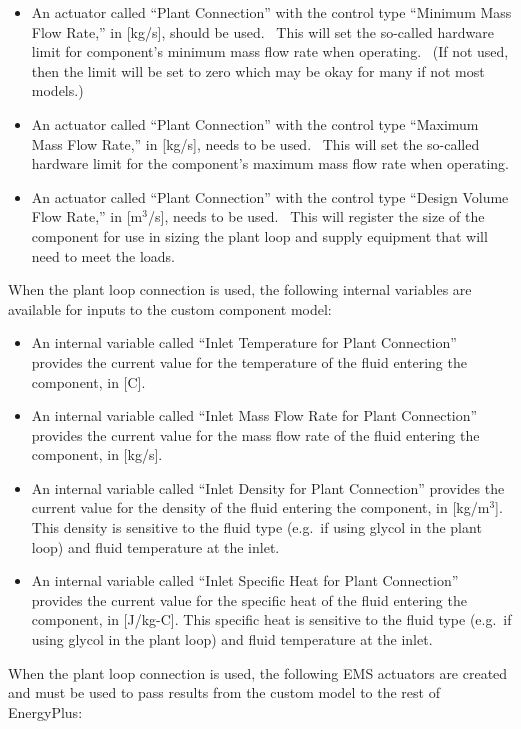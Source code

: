\begin{itemize}
\item
  An actuator called ``Plant Connection'' with the control type ``Minimum Mass Flow Rate,'' in {[}kg/s{]}, should be used.~ This will set the so-called hardware limit for component's minimum mass flow rate when operating.~ (If not used, then the limit will be set to zero which may be okay for many if not most models.)
\item
  An actuator called ``Plant Connection'' with the control type ``Maximum Mass Flow Rate,'' in {[}kg/s{]}, needs to be used.~ This will set the so-called hardware limit for the component's maximum mass flow rate when operating.
\item
  An actuator called ``Plant Connection'' with the control type ``Design Volume Flow Rate,'' in {[}m\(^{3}\)/s{]}, needs to be used.~ This will register the size of the component for use in sizing the plant loop and supply equipment that will need to meet the loads.
\end{itemize}

When the plant loop connection is used, the following internal variables are available for inputs to the custom component model:

\begin{itemize}
\item
  An internal variable called ``Inlet Temperature for Plant Connection'' provides the current value for the temperature of the fluid entering the component, in {[}C{]}.
\item
  An internal variable called ``Inlet Mass Flow Rate for Plant Connection'' provides the current value for the mass flow rate of the fluid entering the component, in {[}kg/s{]}.
\item
  An internal variable called ``Inlet Density for Plant Connection'' provides the current value for the density of the fluid entering the component, in {[}kg/m\(^{3}\){]}.~ This density is sensitive to the fluid type (e.g.~if using glycol in the plant loop) and fluid temperature at the inlet.
\item
  An internal variable called ``Inlet Specific Heat for Plant Connection'' provides the current value for the specific heat of the fluid entering the component, in {[}J/kg-C{]}. This specific heat is sensitive to the fluid type (e.g.~if using glycol in the plant loop) and fluid temperature at the inlet.
\end{itemize}

When the plant loop connection is used, the following EMS actuators are created and must be used to pass results from the custom model to the rest of EnergyPlus:

